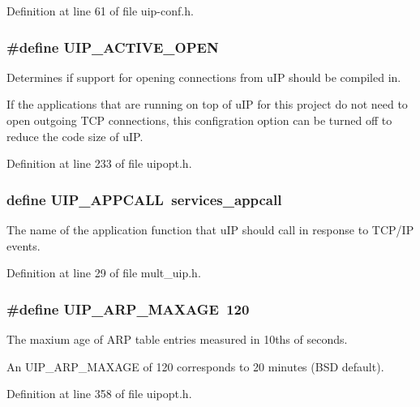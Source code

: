 Definition at line 61 of file uip-\/conf.h.

\hypertarget{group__uipopt_gaac0de06236b02659460445de30776e00}{
\subsubsection[{UIP\_\-ACTIVE\_\-OPEN}]{\setlength{\rightskip}{0pt plus 5cm}\#define UIP\_\-ACTIVE\_\-OPEN}}
\label{group__uipopt_gaac0de06236b02659460445de30776e00}
Determines if support for opening connections from uIP should be compiled in.

If the applications that are running on top of uIP for this project do not need to open outgoing TCP connections, this configration option can be turned off to reduce the code size of uIP. 

Definition at line 233 of file uipopt.h.

\hypertarget{group__uipopt_ga41aa744caa46913b3b3aedb2a4e78546}{
\subsubsection[{UIP\_\-APPCALL}]{\setlength{\rightskip}{0pt plus 5cm}define UIP\_\-APPCALL~services\_\-appcall}}
\label{group__uipopt_ga41aa744caa46913b3b3aedb2a4e78546}
The name of the application function that uIP should call in response to TCP/IP events. 

Definition at line 29 of file mult\_\-uip.h.

\hypertarget{group__uipopt_ga3090117ef3ff5775b77cb1960e442d07}{
\subsubsection[{UIP\_\-ARP\_\-MAXAGE}]{\setlength{\rightskip}{0pt plus 5cm}\#define UIP\_\-ARP\_\-MAXAGE~120}}
\label{group__uipopt_ga3090117ef3ff5775b77cb1960e442d07}
The maxium age of ARP table entries measured in 10ths of seconds.

An UIP\_\-ARP\_\-MAXAGE of 120 corresponds to 20 minutes (BSD default). 

Definition at line 358 of file uipopt.h.

